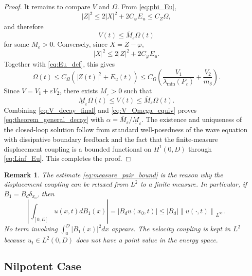 \documentclass[journal]{IEEEtran}
\newtheorem{remark}{Remark}
\newcommand{\eps}{\varepsilon}
\newcommand{\norm}[1]{\left\|#1\right\|}
\newcommand{\abs}[1]{\left|#1\right|}
\begin{document}
\begin{proof}
It remains to compare $V$ and $\Omega$. From \eqref{eq:phi_Eu},
\begin{equation}
 \abs{Z}^2\le 2\abs{X}^2+2C_\varphi E_u\le C_Z\Omega,
\end{equation}
and therefore
\begin{equation}
 V(t)\le \overline M_\eps\Omega(t)
\end{equation}
for some $\overline M_\eps>0$. Conversely, since $X=Z-\varphi$,
\begin{equation}
 \abs{X}^2\le 2\abs{Z}^2+2C_\varphi E_u.
\end{equation}
Together with \eqref{eq:Eu_def}, this gives
\begin{equation}
 \Omega(t)\le C_\Omega\left(\abs{Z(t)}^2+E_u(t)\right)
 \le C_\Omega\left(\frac{V_1}{\lambda_{\min}(P_\eps)}+
\frac{V_2}{m_\delta}\right).
\end{equation}
Since $V=V_1+\eps V_2$, there exists $\underline M_\eps>0$ such that
\begin{equation}
 \underline M_\eps\Omega(t)\le V(t)\le \overline M_\eps\Omega(t).\label{eq:V_Omega_equiv}
\end{equation}
Combining \eqref{eq:V_decay_final} and \eqref{eq:V_Omega_equiv} proves \eqref{eq:theorem_general_decay} with $\alpha=\overline M_\eps/\underline M_\eps$. The existence and uniqueness of the closed-loop solution follow from standard well-posedness of the wave equation with dissipative boundary feedback and the fact that the finite-measure displacement coupling is a bounded functional on $H^1(0,D)$ through \eqref{eq:Linf_Eu}. This completes the proof.
\end{proof}

\begin{remark}\label{rem:measure}
The estimate \eqref{eq:measure_pair_bound} is the reason why the displacement coupling can be relaxed from $L^2$ to a finite measure. In particular, if $B_1=B_d\delta_{x_0}$, then
\begin{equation}
 \left|\int_{[0,D]}u(x,t)dB_1(x)\right|=\abs{B_du(x_0,t)}
 \le \abs{B_d}\norm{u(\cdot,t)}_{L^\infty}.
\end{equation}
No term involving $\int_0^D\abs{B_1(x)}^2dx$ appears. The velocity coupling is kept in $L^2$ because $u_t\in L^2(0,D)$ does not have a point value in the energy space.
\end{remark}

\subsection{Nilpotent Case}
\end{document}
